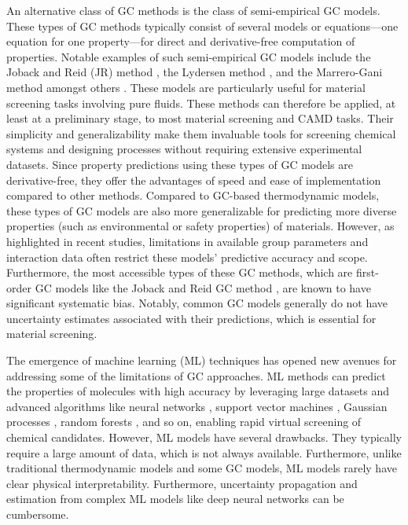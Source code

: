 \documentclass[journal=jacsat,manuscript=article, ]{achemso}
\begin{document}
An alternative class of GC methods is the class of semi-empirical GC models. These types of GC methods typically consist of several models or equations—one equation for one property—for direct and derivative-free computation of properties. 
Notable examples of such semi-empirical GC models include the Joback and Reid (JR) method \cite{jobackEstimationPureComponentProperties1987}, the Lydersen method \cite{simonEstimationCriticalProperties1956}, and the Marrero-Gani method \cite{marreroGroupcontributionBasedEstimation2001b} amongst others \cite{constantinouNewGroupContribution1994}. These models are particularly useful for material screening tasks involving pure fluids. These methods can therefore be applied, at least at a preliminary stage, to most material screening and CAMD tasks. 
Their simplicity and generalizability make them invaluable tools for screening chemical systems and designing processes without requiring extensive experimental datasets. 
Since property predictions using these types of GC models are derivative-free, they offer the advantages of speed and ease of implementation compared to other methods. Compared to GC-based thermodynamic models, these types of GC models are also more generalizable for predicting more diverse properties (such as environmental or safety properties) of materials.
However, as highlighted in recent studies, \cite{jirasekPredictionParametersGroup2023a} limitations in available group parameters and interaction data often restrict these models' predictive accuracy and scope. 
Furthermore, the most accessible types of these GC methods, which are first-order GC models like the Joback and Reid GC method \cite{jobackEstimationPureComponentProperties1987}, are known to have significant systematic bias. 
Notably, common GC models generally do not have uncertainty estimates associated with their predictions, which is essential for material screening. 

The emergence of machine learning (ML) techniques has opened new avenues for addressing some of the limitations of GC approaches. 
ML methods can predict the properties of molecules with high accuracy by leveraging large datasets and advanced algorithms like neural networks \cite{taskinenPredictionPhysicochemicalProperties2003}, support vector machines \cite{zhaoApplicationSupportVector2006, xueSupportVectorMachinesBased2004}, Gaussian processes \cite{obrezanovaGaussianProcessesMethod2007,
pustokhinaDevelopingRobustModel2021,
bishnoiScalableGaussianProcesses2021}, random forests \cite{palmerRandomForestModels2007}, and so on, enabling rapid virtual screening of chemical candidates. 
However, ML models have several drawbacks. They typically require a large amount of data, which is not always available. 
Furthermore, unlike traditional thermodynamic models and some GC models, ML models rarely have clear physical interpretability. 
Furthermore, uncertainty propagation and estimation from complex ML models like deep neural networks can be cumbersome. 
\end{document}
